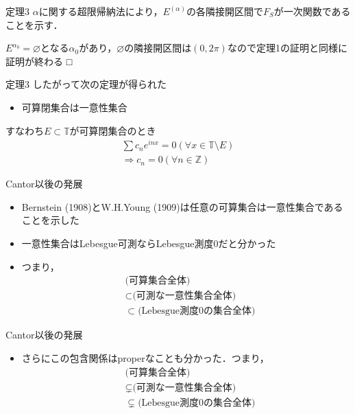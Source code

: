 \documentclass[dvipdfmx,17pt]{beamer}
\theoremstyle{plain}
\newcommand{\Z}{\mathbb{Z}}
\begin{document}
\begin{frame}{定理3}
$\alpha$に関する超限帰納法により，$E^{(\alpha)}$の各隣接開区間で$F_S$が一次関数であることを示す．

$E^{\alpha_0} = \varnothing$となる$\alpha_0$があり，$\varnothing$の隣接開区間は$(0, 2\pi)$なので定理1の証明と同様に証明が終わる □
\end{frame}

\begin{frame}{定理3}
したがって次の定理が得られた
\begin{itemize}
\item 可算閉集合は一意性集合
\end{itemize}

すなわち$E \subset \mathbb{T}$が可算閉集合のとき
\begin{align*}
\sum c_n e^{inx} = 0 (\forall x \in \mathbb{T} \setminus E) \\
\Rightarrow c_n = 0 (\forall n\in\Z)
\end{align*}

\end{frame}

\begin{frame}{Cantor以後の発展}
\begin{itemize}
\item Bernstein (1908)とW.H.Young (1909)は任意の可算集合は一意性集合であることを示した
\item 一意性集合はLebesgue可測ならLebesgue測度$0$だと分かった
\item つまり，
\begin{align*}&\text{(可算集合全体)}\\
&\subset \text{(可測な一意性集合全体)} \\
&\subset \text{(Lebesgue測度$0$の集合全体)}
\end{align*}
\end{itemize}
\end{frame}

\begin{frame}{Cantor以後の発展}
	\begin{itemize}
		\item さらにこの包含関係はproperなことも分かった．つまり，
		\begin{align*}&\text{(可算集合全体)}\\
		&\subsetneq \text{(可測な一意性集合全体)} \\
		&\subsetneq \text{(Lebesgue測度$0$の集合全体)}
		\end{align*}
	\end{itemize}
\end{frame}
\end{document}
